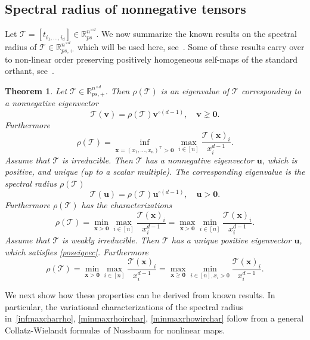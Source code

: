 \documentclass{amsart}
\newcommand{\R}{\mathbb{R}}
\newcommand{\uu}{\mathbf{u}}
\newcommand{\bv}{\mathbf{v}}
\newcommand{\x}{\mathbf{x}}
\newcommand{\0}{\mathbf{0}}
\newcommand{\1}{\mathbf{1}}
\newcommand{\cT}{\mathcal{T}}
\newcommand{\trans}{^\top}
\newtheorem{theorem}[theo]{Theorem}
\theoremstyle{remark}
\numberwithin{equation}{section} %
\begin{document}
 \subsection{Spectral radius of nonnegative tensors}
 Let $\cT=[t_{i_1,\ldots,i_d}]\in \R^{n^{\times d}}_{ps}$. 
%
%
 We now summarize the known results on the spectral radius of $\cT\in\R_{ps,+}^{n^{\times d}}$ which will be used here, see~\cite{CPZ08,FGH}. 
Some of these results carry over to non-linear order preserving positively homogeneous self-maps of the standard orthant, see~\cite{nuss86,GG04}.
%
 \begin{theorem}\label{propsecradten}  Let $\cT\in\R_{ps,+}^{n^{\times d}}$.  Then $\rho(\cT)$ is an eigenvalue of $\cT$ corresponding to a nonnegative
 eigenvector
 \begin{equation}\label{noneigwkir}
 \cT(\bv)=\rho(\cT)\bv^{\circ(d-1)}, \quad \bv \gneq \0.
 \end{equation}
 Furthermore
 \begin{equation}\label{infmaxcharrho}
 \rho(\cT)=\inf_{\x=(x_1,\ldots,x_n)\trans>\0} \max_{i\in [n]}\frac{\cT(\x)_i}{x_i^{d-1}}.
 \end{equation}
 Assume that $\cT$ is irreducible.  Then $\cT$ has a nonnegative eigenvector $\uu$, which is positive, and unique (up to a scalar multiple).
%
%
%
The corresponding eigenvalue is the spectral radius $\rho(\cT)$
 \begin{equation}\label{poseigvec}
 \cT(\uu)=\rho(\cT)\uu^{\circ(d-1)}, \quad \uu>\0.
 \end{equation}
 Furthermore $\rho(\cT)$ has the characterizations
 \begin{equation}\label{minmaxrhoirchar}
 \rho(\cT)=\min_{\x>\0} \max_{i\in [n]}\frac{\cT(\x)_i}{x_i^{d-1}}=\max_{\x>\0} \min_{i\in [n]}\frac{\cT(\x)_i}{x_i^{d-1}}.
 \end{equation}
 Assume that $\cT$ is weakly irreducible.  Then $\cT$ has a unique positive eigenvector $\uu$,
%
%
%
which satisfies \eqref{poseigvec}.
 Furthermore
 \begin{equation}\label{minmaxrhowirchar}
 \rho(\cT)=\min_{\x>\0} \max_{i\in [n]}\frac{\cT(\x)_i}{x_i^{d-1}}=\max_{\x\gneq\0} \min_{i\in [n], x_i>0}\frac{\cT(\x)_i}{x_i^{d-1}}.
 \end{equation}
 \end{theorem}
%
%
We next show how these properties can be derived from known results. In particular, the variational characterizations of the spectral radius in~\eqref{infmaxcharrho}, \eqref{minmaxrhoirchar}, \eqref{minmaxrhowirchar} follow from a general Collatz-Wielandt formul\ae\ of Nussbaum for nonlinear maps. 
\end{document}

